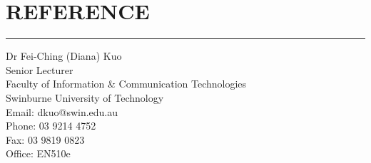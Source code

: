 \documentclass{article}
\def\sectionskip{\medskip} %
\begin{document}
\section*{REFERENCE}
\hrule %
\sectionskip

	Dr Fei-Ching (Diana) Kuo \\
	Senior Lecturer \\
	Faculty of Information \& Communication Technologies \\
	Swinburne University of Technology \\
	Email: dkuo@swin.edu.au \\
	Phone: 03 9214 4752 \\
	Fax: 03 9819 0823 \\
	Office: EN510e \\
	
\end{document}
